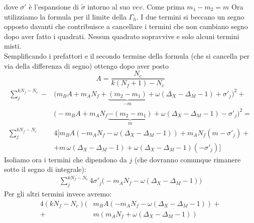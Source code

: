 \documentclass[a4paper,12pt]{article}
\begin{document}
dove $\sigma'$ è l'espansione di $\tilde{\sigma}$ intorno al suo $vev$. Come prima $m_1 - m_2 = m $
Ora utilizziamo la formula per il limite della $\Gamma_h$. I due termini si beccano un segno opposto davanti che contribuisce a cancellare i termini che non cambiano segno dopo aver fatto i quadrati. Nessun quadrato sopravvive e solo alcuni termini misti.\\
Semplificando i prefattori e il secondo termine della formula (che si cancella per via della differenza di segno) ottengo dopo aver posto
$$
 A = \frac{N_c}{k(N_f+1) - N_c}
$$
\begin{align*}
\sum_j^{k N_f - N_c}- &\big( m_B  A + m_A N_f + \underbrace{{(m_2 - m_1 )}}_{-m} + \omega( \Delta_X - \Delta_M - 1)  + \sigma'_j \big)^2  + \\
& \big( - m_B  A + m_A N_f \underbrace{- (m_2 - m_1 )}_{m} + \omega( \Delta_X - \Delta_M - 1) - \sigma'_j \big)^2 = \\
\sum_j^{k N_f - N_c} & 4 \big[  m_B A \left( -  m_A N_f - \omega( \Delta_X - \Delta_M - 1) \right) + m_A N_f ( m  - \sigma'_j ) +\\
&+ m \, \omega( \Delta_X - \Delta_M - 1) +  \omega( \Delta_X - \Delta_M - 1)( - \sigma'_j) \big]
\end{align*}
Isoliamo ora i termini che dipendono da $j$ (che dovranno comunque rimanere sotto il segno di integrale):
\begin{align*}
\sum_j^{k N_f - N_c} 4 \sigma'_j \big( - m_A N_f -  \omega( \Delta_X - \Delta_M - 1) \big)
\end{align*}
Per gli altri termini invece avremo:
\begin{align*}
4 ( k N_f - N_c ) \big( & m_B A (  -  m_A N_f - \omega( \Delta_X - \Delta_M - 1)) +\\
 +  & m ( m_A N_f + \omega( \Delta_X - \Delta_M - 1))
\end{align*}
\end{document}
